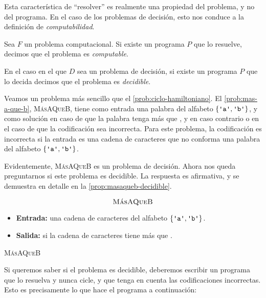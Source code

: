Esta característica de ``resolver'' es realmente una propiedad del problema, y no del programa. En el caso de los problemas de decisión, esto nos conduce a la definición de \emph{computabilidad}.

\begin{definicion}\label{def:decidible}
Sea $F$ un problema computacional. Si existe un programa $P$ que lo resuelve, decimos que el problema es \emph{computable}.

En el caso en el que $D$ sea un problema de decisión, si existe un programa $P$ que lo decida decimos que el problema es \emph{decidible}.
\end{definicion}

Veamos un problema más sencillo que el \cref{prob:ciclo-hamiltoniano}. El \cref{prob:mas-a-que-b}, \textsc{MásAQueB}, tiene como entrada una palabra del alfabeto $\{\palabra{a}, \palabra{b}\}$, y como solución  en caso de que la palabra tenga más  que , y  en caso contrario o en el caso de que la codificación sea incorrecta. Para este problema, la codificación es incorrecta si la entrada es una cadena de caracteres que no conforma una palabra del alfabeto $\{\palabra{a}, \palabra{b}\}$.

Evidentemente, \textsc{MásAQueB} es un problema de decisión. Ahora nos queda preguntarnos si este problema es decidible. La respuesta es afirmativa, y se demuestra en detalle en la \cref{prop:masaqueb-decidible}.

\begin{problema}
\begin{framed}
$$\text{\textsc{MásAQueB}}$$

\begin{itemize}
    \item \textbf{Entrada:} una cadena de caracteres del alfabeto $\{\palabra{a}, \palabra{b}\}$.
    \item \textbf{Salida:} si la cadena de caracteres tiene más  que .
\end{itemize}
\end{framed}
\caption{\textsc{MásAQueB}}
\label{prob:mas-a-que-b}
\end{problema}

Si queremos saber si el problema es decidible, deberemos escribir un programa que lo resuelva y nunca cicle, y que tenga en cuenta las codificaciones incorrectas. Esto es precisamente lo que hace el programa a continuación:

